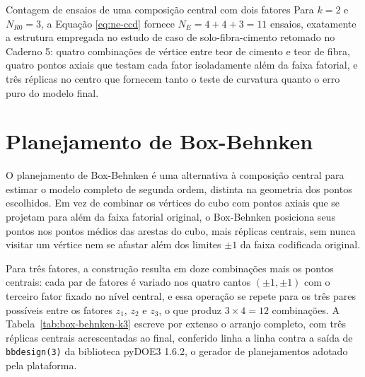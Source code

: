 \documentclass{doeapostila}
\begin{document}
\begin{aplicacao}{Contagem de ensaios de uma composição central com dois fatores}
Para $k=2$ e $N_{R0}=3$, a Equação \eqref{eq:ne-ccd} fornece $N_{E} = 4 + 4 +
3 = 11$ ensaios, exatamente a estrutura empregada no estudo de caso de
solo-fibra-cimento retomado no Caderno 5: quatro combinações de vértice entre
teor de cimento e teor de fibra, quatro pontos axiais que testam cada fator
isoladamente além da faixa fatorial, e três réplicas no centro que fornecem
tanto o teste de curvatura quanto o erro puro do modelo final.
\end{aplicacao}

\section{Planejamento de Box-Behnken}

O planejamento de Box-Behnken é uma alternativa à composição central para
estimar o modelo completo de segunda ordem, distinta na geometria dos pontos
escolhidos. Em vez de combinar os vértices do cubo com pontos axiais que se
projetam para além da faixa fatorial original, o Box-Behnken posiciona seus
pontos nos pontos médios das arestas do cubo, mais réplicas centrais, sem
nunca visitar um vértice nem se afastar além dos limites $\pm1$ da faixa
codificada original.

Para três fatores, a construção resulta em doze combinações mais os pontos
centrais: cada par de fatores é variado nos quatro cantos $(\pm1,\pm1)$ com
o terceiro fator fixado no nível central, e essa operação se repete para os
três pares possíveis entre os fatores $z_{1}$, $z_{2}$ e $z_{3}$, o que
produz $3 \times 4 = 12$ combinações. A Tabela~\ref{tab:box-behnken-k3}
escreve por extenso o arranjo completo, com três réplicas centrais
acrescentadas ao final, conferido linha a linha contra a saída de
\texttt{bbdesign(3)} da biblioteca pyDOE3 1.6.2, o gerador de planejamentos
adotado pela plataforma.
\end{document}

